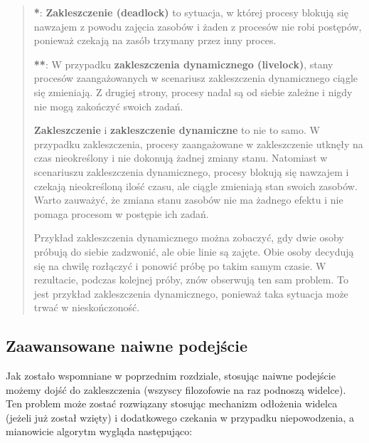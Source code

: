 \documentclass[11pt]{article}
\begin{document}
\begin{quote}
\textbf{*}: \textbf{Zakleszczenie (deadlock)} to sytuacja, w której
procesy blokują się nawzajem z powodu zajęcia zasobów i żaden z procesów
nie robi postępów, ponieważ czekają na zasób trzymany przez inny proces.

\textbf{**}: W przypadku \textbf{zakleszczenia dynamicznego (livelock)},
stany procesów zaangażowanych w scenariusz zakleszczenia dynamicznego
ciągle się zmieniają. Z drugiej strony, procesy nadal są od siebie
zależne i nigdy nie mogą zakończyć swoich zadań.

\textbf{Zakleszczenie} i \textbf{zakleszczenie dynamiczne} to nie to
samo. W przypadku zakleszczenia, procesy zaangażowane w zakleszczenie
utknęły na czas nieokreślony i nie dokonują żadnej zmiany stanu.
Natomiast w scenariuszu zakleszczenia dynamicznego, procesy blokują się
nawzajem i czekają nieokreśloną ilość czasu, ale ciągle zmieniają stan
swoich zasobów. Warto zauważyć, że zmiana stanu zasobów nie ma żadnego
efektu i nie pomaga procesom w postępie ich zadań.

Przykład zakleszczenia dynamicznego można zobaczyć, gdy dwie osoby
próbują do siebie zadzwonić, ale obie linie są zajęte. Obie osoby
decydują się na chwilę rozłączyć i ponowić próbę po takim samym czasie.
W rezultacie, podczas kolejnej próby, znów obserwują ten sam problem. To
jest przykład zakleszczenia dynamicznego, ponieważ taka sytuacja może
trwać w nieskończoność.
\end{quote}

    \hypertarget{zaawansowane-naiwne-podejux15bcie}{%
\subsection{Zaawansowane naiwne
podejście}\label{zaawansowane-naiwne-podejux15bcie}}

Jak zostało wspomniane w poprzednim rozdziale, stosując naiwne podejście
możemy dojść do zakleszczenia (wszyscy filozofowie na raz podnoszą
widelce). Ten problem może zostać rozwiązany stosując mechanizm
odłożenia widelca (jeżeli już został wzięty) i dodatkowego czekania w
przypadku niepowodzenia, a mianowicie algorytm wygląda następująco:
\end{document}
